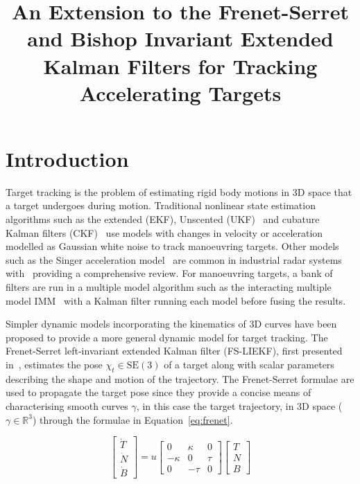 \documentclass[11pt]{article}
\title{An Extension to the Frenet-Serret and Bishop Invariant Extended Kalman Filters for Tracking Accelerating Targets}
\author{}
\date{}
\begin{document}
\maketitle

\section{Introduction}

Target tracking is the problem of estimating rigid body motions in 3D space that a target undergoes during motion. Traditional nonlinear state estimation algorithms such as the extended (EKF), Unscented (UKF)~\cite{julier2000new} and cubature Kalman filters (CKF)~\cite{arasaratnam2009cubature} use models with changes in velocity or acceleration modelled as Gaussian white noise to track manoeuvring targets. Other models such as the Singer acceleration model~\cite{singer1970estimating} are common in industrial radar systems with~\cite{li2003survey} providing a comprehensive review. For manoeuvring targets, a bank of filters are run in a multiple model algorithm such as the interacting multiple model IMM~\cite{li1993performance} with a Kalman filter running each model before fusing the results.

Simpler dynamic models incorporating the kinematics of 3D curves have been proposed to provide a more general dynamic model for target tracking. The Frenet-Serret left-invariant extended Kalman filter (FS-LIEKF), first presented in~\cite{pilte2017tracking}, estimates the pose $\chi_t \in \mathrm{SE}(3)$ of a target along with scalar parameters describing the shape and motion of the trajectory. The Frenet-Serret formulae are used to propagate the target pose since they provide a concise means of characterising smooth curves $\gamma$, in this case the target trajectory, in 3D space ($\gamma \in \mathbb{R}^3$) through the formulae in Equation~\eqref{eq:frenet}.

\begin{equation}
\begin{bmatrix}
\dot{T} \\
\dot{N} \\
\dot{B}
\end{bmatrix}
= u
\begin{bmatrix}
0 & \kappa & 0 \\
-\kappa & 0 & \tau \\
0 & -\tau & 0
\end{bmatrix}
\begin{bmatrix}
T \\
N \\
B
\end{bmatrix}
\label{eq:frenet}
\end{equation}
\end{document}
